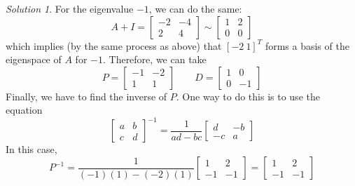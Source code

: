 \documentclass{article}
\theoremstyle{remark}
\newtheorem*{solution}{Solution}
\begin{document}
\begin{solution}
  For the eigenvalue $-1$, we can do the same:
  \begin{displaymath}
    A + I =
    \begin{bmatrix}
      -2 & -4 \\
      2 & 4
    \end{bmatrix}
    \sim
    \begin{bmatrix}
      1 & 2 \\
      0 & 0
    \end{bmatrix}
  \end{displaymath}
  which implies (by the same process as above) that $[-2 \ 1]^T$ forms a basis of the eigenspace of $A$ for $-1$.
  Therefore, we can take
  \begin{displaymath}
    P =
    \begin{bmatrix}
      -1 & -2 \\
      1 & 1
    \end{bmatrix}
    \qquad
    D =
    \begin{bmatrix}
      1 & 0 \\
      0 & -1
    \end{bmatrix}
  \end{displaymath}
  Finally, we have to find the inverse of $P$.
  One way to do this is to use the equation
  \begin{displaymath}
    \begin{bmatrix}
      a & b \\
      c & d
    \end{bmatrix}^{-1}
    =
    \frac{1}{ad - bc}
    \begin{bmatrix}
      d & -b \\
      -c & a
    \end{bmatrix}
  \end{displaymath}
  In this case,
  \begin{displaymath}
    P^{-1}=
    \frac{1}{(-1)(1) - (-2)(1)}
    \begin{bmatrix}
      1 & 2 \\
      -1 & -1
    \end{bmatrix}
    =
    \begin{bmatrix}
      1 & 2 \\
      -1 & -1
    \end{bmatrix}
  \end{displaymath}
\end{solution}

\pagebreak
\end{document}
